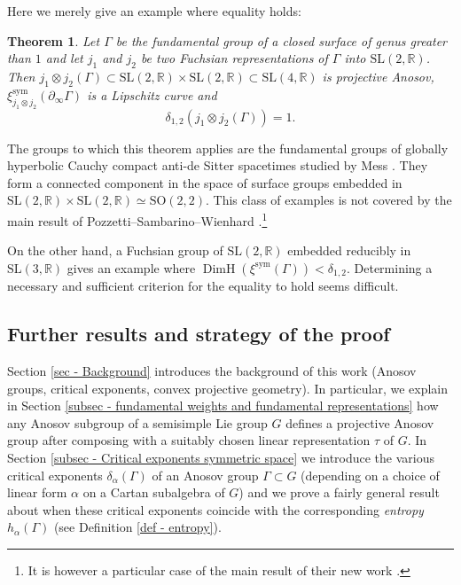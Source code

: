 \documentclass[JEP,XML,SOM,Unicode,NoEqCountersInSection,NoFloatCountersInSection,published]{cedram}
\newcommand{\sym}{\mathrm{sym}}
\newtheorem{theo}{Theorem}[section]
\theoremstyle{definition}
\newcommand{\R}{\mathbb{R}}
\newcommand{\SL}{\mathrm{SL}}
\newcommand{\SO}{\mathrm{SO}}
\DeclareMathOperator{\DimH}{DimH}
\let\G\Gamma
\begin{document}
Here we merely give an example where equality holds:
\begin{theo} \label{theo - simple root exponent tensor product Fuchsian}
Let $\G$ be the fundamental group of a closed surface of genus greater than $1$ and let $j_1$ and $j_2$ be two Fuchsian representations of $\G$ into $\SL(2,\R)$. Then $j_1\otimes j_2(\G) \subset \SL(2,\R)\times \SL(2,\R) \subset \SL(4,\R)$ is projective Anosov, $\xi_{j_1\otimes j_2}^{\sym}(\partial_\infty \G)$ is a Lipschitz curve and
\[\delta_{1,2}(j_1\otimes j_2(\G)) = 1.\]
\end{theo}

The groups to which this theorem applies are the fundamental groups of globally hyperbolic Cauchy compact anti-de Sitter spacetimes studied by Mess \cite{mess2007lorentz}. They form a connected component in the space of surface groups embedded in \hbox{$\SL(2,\R)\times \SL(2,\R) \simeq \SO(2,2)$}. This class of examples is not covered by the main result of Pozzetti--Sambarino--Wienhard \cite{PSW19}.\footnote{It is however a particular case of the main result of their new work \cite{PSW19b}.}

On the other hand, a Fuchsian group of $\SL(2,\R)$ embedded reducibly in $\SL(3,\R)$ gives an example where $\DimH(\xi^{\sym}(\G)) < \delta_{1,2}$. Determining a necessary and sufficient criterion for the equality to hold seems difficult.

\subsection{Further results and strategy of the proof}

Section \ref{sec - Background} introduces the background of this work (Anosov groups, critical exponents, convex projective geometry). In particular, we explain in Section \ref{subsec - fundamental weights and fundamental representations} how any Anosov subgroup of a semisimple Lie group $G$ defines a projective Anosov group after composing with a suitably chosen linear representation $\tau$ of $G$. In Section \ref{subsec - Critical exponents symmetric space} we introduce the various critical exponents $\delta_\alpha(\G)$ of an Anosov group $\G\subset G$ (depending on a choice of linear form $\alpha$ on a Cartan subalgebra of $G$) and we prove a fairly general result about when these critical exponents coincide with the corresponding \emph{entropy} $h_\alpha(\Gamma)$ (see Definition \ref{def - entropy}).
\end{document}
